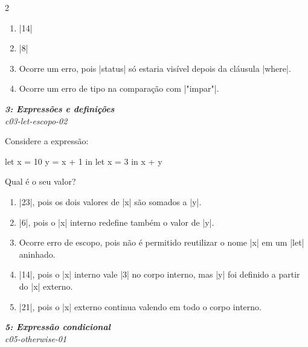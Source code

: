 \documentclass[a4paper,10pt,brazil]{article}
\begin{document}
\begin{multicols}{2}
\begin{enumerate}
  \item \haskellinline|14|

  \item \haskellinline|8|

  \item Ocorre um erro, pois \haskellinline|status| só estaria visível depois da cláusula \haskellinline|where|.

  \item Ocorre um erro de tipo na comparação com \haskellinline|"impar"|.


\end{enumerate}

\begin{flushright}
  \footnotesize
  \textit{\textbf{3: Expressões e definições}}\\
  \textit{c03-let-escopo-02}\\

\end{flushright}
Considere a expressão:

\begin{haskellcode}
let x = 10
    y = x + 1
in let x = 3
   in x + y
\end{haskellcode}

Qual é o seu valor?

\begin{enumerate}
  \item \haskellinline|23|, pois os dois valores de \haskellinline|x| são somados a \haskellinline|y|.

  \item \haskellinline|6|, pois o \haskellinline|x| interno redefine também o valor de \haskellinline|y|.

  \item Ocorre erro de escopo, pois não é permitido reutilizar o nome \haskellinline|x| em um \haskellinline|let| aninhado.

  \item \haskellinline|14|, pois o \haskellinline|x| interno vale \haskellinline|3| no corpo interno, mas \haskellinline|y| foi definido a partir do \haskellinline|x| externo.

  \item \haskellinline|21|, pois o \haskellinline|x| externo continua valendo em todo o corpo interno.


\end{enumerate}

\begin{flushright}
  \footnotesize
  \textit{\textbf{5: Expressão condicional}}\\
  \textit{c05-otherwise-01}\\


\end{flushright}
\end{multicols}
\end{document}
